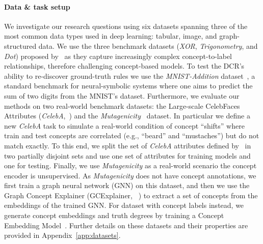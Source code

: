 \paragraph{Data \& task setup}
We investigate our research questions using six datasets spanning three of the most common data types used in deep learning: tabular, image, and graph-structured data.
We use the three benchmark datasets (\textit{XOR}, \textit{Trigonometry}, and \textit{Dot}) proposed by~\citet{zarlenga2022concept} as they capture increasingly complex concept-to-label relationships, therefore challenging concept-based models. To test the DCR's ability to re-discover ground-truth rules we use the \textit{MNIST-Addition} dataset~\cite{manhaeve2018deepproblog}, a standard benchmark for neural-symbolic systems where one aims to predict the sum of two digits from the MNIST's dataset. 
Furthermore, we evaluate our methods on two real-world benchmark datasets: the Large-scale CelebFaces Attributes (\emph{CelebA},~\citep{liu2015deep}) and the \emph{Mutagenicity}~\cite{morris2020tudataset} dataset. In particular we define a new \emph{CelebA} task to simulate a real-world condition of concept ``shifts'' where train and test concepts are correlated (e.g., ``beard'' and ``mustaches'') but do not match exactly. To this end, we split the set of \emph{CelebA} attributes defined by~\citet{zarlenga2022concept} in two partially disjoint sets and use one set of attributes for training models and one for testing.
Finally, we use \emph{Mutagenicity} as a real-world scenario the concept encoder is unsupervised.
As \emph{Mutagenicity} does not have concept annotations, we first train a graph neural network (GNN) on this dataset, and then we use the Graph Concept Explainer (GCExplainer, ~\cite{magister2021gcexplainer}) to extract a set of concepts from the embeddings of the trained GNN.
For dataset with concept labels instead, we generate concept embeddings and truth degrees by training a Concept Embedding Model~\cite{zarlenga2022concept}.
Further details on these datasets and their properties are provided in Appendix~\ref{app:datasets}.


